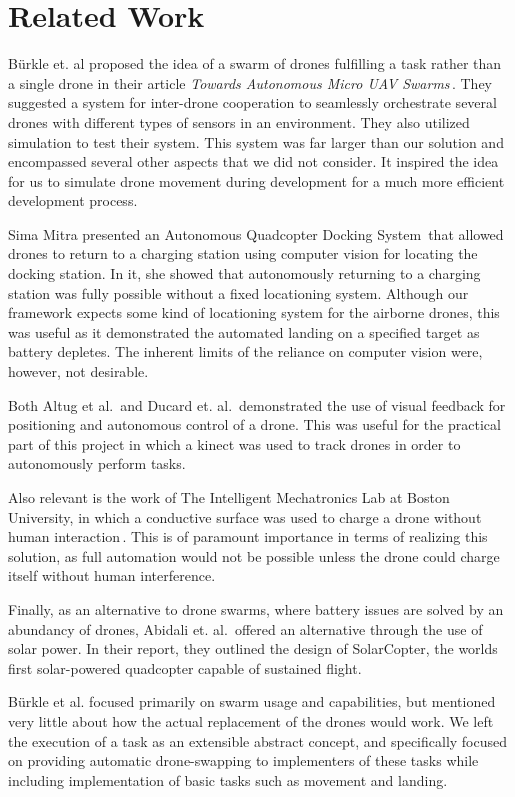 \section{Related Work}
B\"urkle et. al proposed the idea of a swarm of drones fulfilling a task rather than a single drone in their article \textit{Towards Autonomous Micro UAV Swarms}\,\cite{burkleetal}. They suggested a system for inter-drone cooperation to seamlessly orchestrate several drones with different types of sensors in an environment. They also utilized simulation to test their system. This system was far larger than our solution and encompassed several other aspects that we did not consider. It inspired the idea for us to simulate drone movement during development for a much more efficient development process.

Sima Mitra presented an Autonomous Quadcopter Docking System\,\cite{simamitra} that allowed drones to return to a charging station using computer vision for locating the docking station. In it, she showed that autonomously returning to a charging station was fully possible without a fixed locationing system. Although our framework expects some kind of locationing system for the airborne drones, this was useful as it demonstrated the automated landing on a specified target as battery depletes. The inherent limits of the reliance on computer vision were, however, not desirable.

Both Altug et al.\,\cite{altugetal} and Ducard et. al.\,\cite{ducardetal} demonstrated the use of visual feedback for positioning and autonomous control of a drone. This was useful for the practical part of this project in which a kinect was used to track drones in order to autonomously perform tasks.

Also relevant is the work of The Intelligent Mechatronics Lab at Boston University, in which a conductive surface was used to charge a drone without human interaction\,\cite{bostonuni}. This is of paramount importance in terms of realizing this solution, as full automation would not be possible unless the drone could charge itself without human interference.

Finally, as an alternative to drone swarms, where battery issues are solved by an abundancy of drones, Abidali et. al.\,\cite{solarcopter} offered an alternative through the use of solar power. In their report, they outlined the design of SolarCopter, the worlds first solar-powered quadcopter capable of sustained flight.

B\"urkle et al. focused primarily on swarm usage and capabilities, but mentioned very little about how the actual replacement of the drones would work. We left the execution of a task as an extensible abstract concept, and specifically focused on providing automatic drone-swapping to implementers of these tasks while including implementation of basic tasks such as movement and landing.

